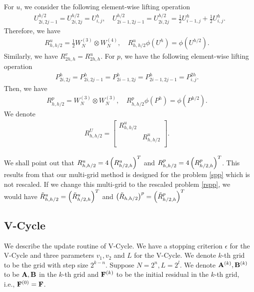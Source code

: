 \documentclass[english]{pkupaper}
\newenvironment{eqt}{\begin{equation}\begin{aligned}}{\end{aligned}\end{equation}}
\begin{document}
For $u$, we consider the following element-wise lifting operation
\begin{eqt}
\label{u2i2j}
&U^{h/2}_{2i,2j-1}=U^{h/2}_{2i,2j}=U^{h}_{i,j}, \quad U^{h/2}_{2i-1,2j-1}=U^{h/2}_{2i,2j}=\frac{1}{2}U^{h}_{i-1,j}+\frac{1}{2}U^{h}_{i,j}.
\end{eqt}
Therefore, we have
\begin{eqt}
R_{h,h/2}^u=\frac{1}{2}W_N^{(3)}\otimes W_N^{(4)}, \quad R_{h,h/2}^u\phi(U^{h})=\phi(U^{h/2}).
\end{eqt}
Similarly, we have $R_{2h,h}^v=R_{2h,h}^u$. For $p$, we have the following element-wise lifting operation
\begin{eqt}
P_{2i,2j}^h=P_{2i,2j-1}^h=P_{2i-1,2j}^h=P_{2i-1,2j-1}^h=P_{i,j}^{2h}.
\end{eqt}
Then, we have
\begin{eqt}
R_{h,h/2}^p=W_N^{(3)}\otimes W_N^{(3)}, \quad R_{h,h/2}^p\phi(P^{h})=\phi(P^{h/2}).
\end{eqt}
We denote
\begin{eqt}
R_{h,h/2}^U=\begin{bmatrix}
R_{h,h/2}^u\\
&R_{h,h/2}^u\\
\end{bmatrix}.
\end{eqt}

We shall point out that $R_{h,h/2}^u=4\left( R_{h/2,h}^u\right)^T$ and $R_{h,h/2}^p=4\left( R_{h/2,h}^p\right)^T$. This results from that our multi-grid method is designed for the problem \ref{spp} which is not rescaled. If we change this multi-grid to the rescaled problem \ref{rspp}, we would have $\tilde R_{h,h/2}^u=\left(\tilde R_{h/2,h}^u\right)^T$ and $\left(\tilde R_{h,h/2}\right)^p= \left(\tilde  R_{h/2,h}^p\right)^T$

\subsection{V-Cycle}
\label{ssec:vcyc}
We describe the update routine of V-Cycle. We have a stopping criterion $\epsilon$ for the V-Cycle and three parameters $v_1, v_2$ and $L$ for the V-Cycle. We denote $k$-th grid to be the grid with step size $2^{k-n}$. Suppose $N=2^{n}, L=2^l$. We denote $\mathbf{A}^{(k)}, \mathbf{B}^{(k)}$ to be $\mathbf{A}, \mathbf{B}$ in the $k$-th grid and $\mathbf{F}^{(k)}$ to be the initial residual in the $k$-th grid, i.e., $\mathbf{F}^{(0)}=\mathbf{F}$.  
\end{document}
